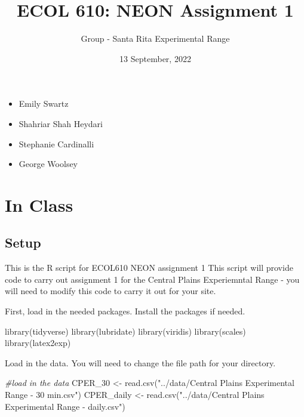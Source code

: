 \documentclass[
]{article}
\title{ECOL 610: NEON Assignment 1}
\author{Group - Santa Rita Experimental Range}
\date{13 September, 2022}
\newenvironment{Shaded}{\begin{snugshade}}{\end{snugshade}}
\newcommand{\CommentTok}[1]{\textcolor[rgb]{0.56,0.35,0.01}{\textit{#1}}}
\newcommand{\FunctionTok}[1]{\textcolor[rgb]{0.00,0.00,0.00}{#1}}
\newcommand{\NormalTok}[1]{#1}
\newcommand{\OtherTok}[1]{\textcolor[rgb]{0.56,0.35,0.01}{#1}}
\newcommand{\StringTok}[1]{\textcolor[rgb]{0.31,0.60,0.02}{#1}}
\providecommand{\tightlist}{%
  \setlength{\itemsep}{0pt}\setlength{\parskip}{0pt}}
\begin{document}
\maketitle

\begin{itemize}
\tightlist
\item
  Emily Swartz
\item
  Shahriar Shah Heydari
\item
  Stephanie Cardinalli
\item
  George Woolsey
\end{itemize}

\hypertarget{in-class}{%
\section{In Class}\label{in-class}}

\hypertarget{setup}{%
\subsection{Setup}\label{setup}}

This is the R script for ECOL610 NEON assignment 1 This script will
provide code to carry out assignment 1 for the Central Plains
Experiemntal Range - you will need to modify this code to carry it out
for your site.

First, load in the needed packages. Install the packages if needed.

\begin{Shaded}
\begin{Highlighting}[]
\FunctionTok{library}\NormalTok{(tidyverse)}
\FunctionTok{library}\NormalTok{(lubridate)}
\FunctionTok{library}\NormalTok{(viridis)}
\FunctionTok{library}\NormalTok{(scales)}
\FunctionTok{library}\NormalTok{(latex2exp)}
\end{Highlighting}
\end{Shaded}

Load in the data. You will need to change the file path for your
directory.

\begin{Shaded}
\begin{Highlighting}[]
\CommentTok{\#load in the data}
\NormalTok{CPER\_30 }\OtherTok{\textless{}{-}} \FunctionTok{read.csv}\NormalTok{(}\StringTok{"../data/Central Plains Experimental Range {-} 30 min.csv"}\NormalTok{)}
\NormalTok{CPER\_daily }\OtherTok{\textless{}{-}} \FunctionTok{read.csv}\NormalTok{(}\StringTok{"../data/Central Plains Experimental Range {-} daily.csv"}\NormalTok{)}
\end{Highlighting}
\end{Shaded}
\end{document}
